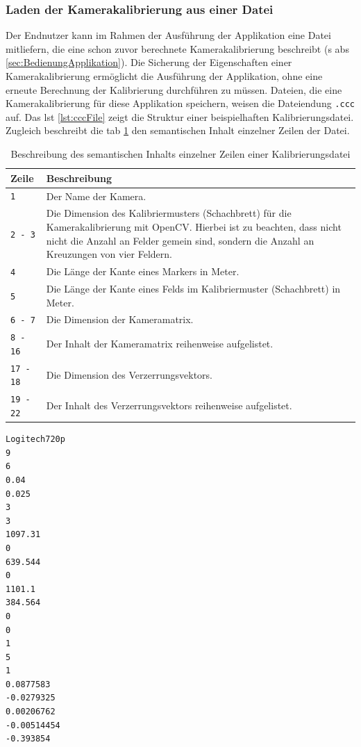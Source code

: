 \subsubsection{Laden der Kamerakalibrierung aus einer Datei}\label{sssec:lokalfile}
Der Endnutzer kann im Rahmen der Ausführung der Applikation eine Datei mitliefern, die eine schon zuvor berechnete Kamerakalibrierung beschreibt (\acs{s} \acs{abs} \ref{sec:BedienungApplikation}). Die Sicherung der Eigenschaften einer Kamerakalibrierung ermöglicht die Ausführung der Applikation, ohne eine erneute Berechnung der Kalibrierung durchführen zu müssen. Dateien, die eine Kamerakalibrierung für diese Applikation speichern, weisen die Dateiendung \grqq \texttt{.ccc}\grqq{} auf. Das \acs{lst} \ref{lst:cccFile} zeigt die Struktur einer beispielhaften Kalibrierungsdatei. Zugleich beschreibt die \acs{tab} \ref{tab:cccFile} den semantischen Inhalt einzelner Zeilen der Datei.

\begin{table}[H]
\centering
\begin{tabular}{|p{3cm}|p{12cm}|}
\hline
\textbf{Zeile} & \textbf{Beschreibung} \\
\hline
\verb|1| & Der Name der Kamera.\\
\hline
\verb|2 - 3| & Die Dimension des Kalibriermusters (Schachbrett) für die Kamerakalibrierung mit OpenCV. Hierbei ist zu beachten, dass nicht nicht die Anzahl an Felder gemein sind, sondern die Anzahl an Kreuzungen von vier Feldern.\\
\hline
\verb|4| & Die Länge der Kante eines Markers in Meter.\\
\hline
\verb|5| & Die Länge der Kante eines Felds im Kalibriermuster (Schachbrett) in Meter.\\
\hline
\verb|6 - 7| & Die Dimension der Kameramatrix.\\
\hline
\verb|8 - 16| & Der Inhalt der Kameramatrix reihenweise aufgelistet.\\
\hline
\verb|17 - 18| & Die Dimension des Verzerrungsvektors.\\
\hline
\verb|19 - 22| & Der Inhalt des Verzerrungsvektors reihenweise aufgelistet.\\
\hline
\end{tabular}
\caption{Beschreibung des semantischen Inhalts einzelner Zeilen einer Kalibrierungsdatei}
\label{tab:cccFile}
\end{table}

\begin{lstlisting}[caption={Struktur einer Datei, die eine Kamerakalibrierung speichert und die Dateiendung \grqq \texttt{.ccc}\grqq{} aufweist}, label={lst:cccFile}]
Logitech720p
9
6
0.04
0.025
3
3
1097.31
0
639.544
0
1101.1
384.564
0
0
1
5
1
0.0877583
-0.0279325
0.00206762
-0.00514454
-0.393854
\end{lstlisting}


